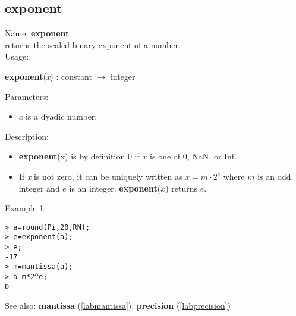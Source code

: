 \subsection{exponent}
\label{labexponent}
\noindent Name: \textbf{exponent}\\
returns the scaled binary exponent of a number.\\
\noindent Usage: 
\begin{center}
\textbf{exponent}(\emph{x}) : \textsf{constant} $\rightarrow$ \textsf{integer}
\\ 
\end{center}
Parameters: 
\begin{itemize}
\item \emph{x} is a dyadic number.
\end{itemize}
\noindent Description: \begin{itemize}

\item \textbf{exponent}(x) is by definition 0 if $x$ is one of 0, NaN, or Inf.

\item If \emph{x} is not zero, it can be uniquely written as $x = m \cdot 2^e$ where
   $m$ is an odd integer and $e$ is an integer. \textbf{exponent}($x$) returns $e$. 
\end{itemize}
\noindent Example 1: 
\begin{center}\begin{minipage}{15cm}\begin{Verbatim}[frame=single]
> a=round(Pi,20,RN);
> e=exponent(a);
> e;
-17
> m=mantissa(a);
> a-m*2^e;
0
\end{Verbatim}
\end{minipage}\end{center}
See also: \textbf{mantissa} (\ref{labmantissa}), \textbf{precision} (\ref{labprecision})

